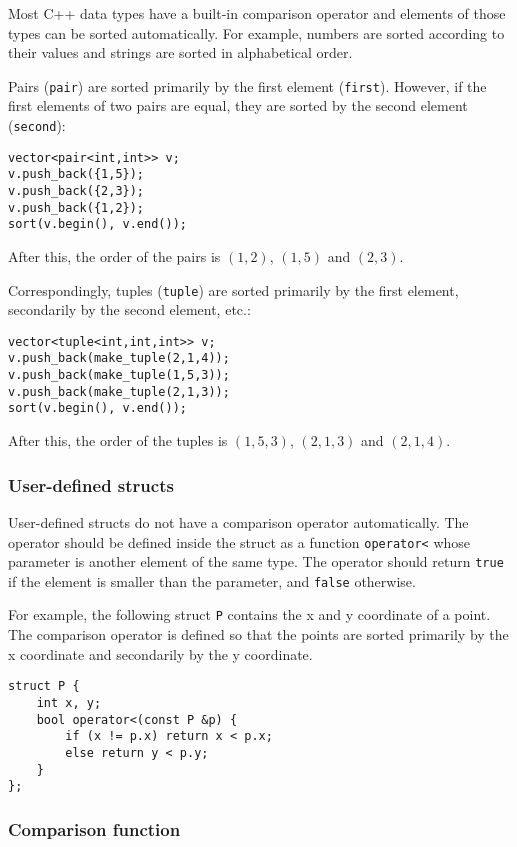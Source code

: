 Most C++ data types have a built-in comparison operator
and elements of those types can be sorted automatically.
For example, numbers are sorted according to their values
and strings are sorted in alphabetical order.


Pairs (\texttt{pair}) are sorted primarily by the first
element (\texttt{first}).
However, if the first elements of two pairs are equal,
they are sorted by the second element (\texttt{second}):
\begin{lstlisting}
vector<pair<int,int>> v;
v.push_back({1,5});
v.push_back({2,3});
v.push_back({1,2});
sort(v.begin(), v.end());
\end{lstlisting}
After this, the order of the pairs is
$(1,2)$, $(1,5)$ and $(2,3)$.


Correspondingly, tuples (\texttt{tuple})
are sorted primarily by the first element,
secondarily by the second element, etc.:
\begin{lstlisting}
vector<tuple<int,int,int>> v;
v.push_back(make_tuple(2,1,4));
v.push_back(make_tuple(1,5,3));
v.push_back(make_tuple(2,1,3));
sort(v.begin(), v.end());
\end{lstlisting}
After this, the order of the tuples is
$(1,5,3)$, $(2,1,3)$ and $(2,1,4)$.

\subsubsection{User-defined structs}

User-defined structs do not have a comparison
operator automatically.
The operator should be defined inside
the struct as a function
\texttt{operator<}
whose parameter is another element of the same type.
The operator should return \texttt{true}
if the element is smaller than the parameter,
and \texttt{false} otherwise.

For example, the following struct \texttt{P}
contains the x and y coordinate of a point.
The comparison operator is defined so that
the points are sorted primarily by the x coordinate
and secondarily by the y coordinate.

\begin{lstlisting}
struct P {
    int x, y;
    bool operator<(const P &p) {
        if (x != p.x) return x < p.x;
        else return y < p.y;
    }
};
\end{lstlisting}

\subsubsection{Comparison function}

